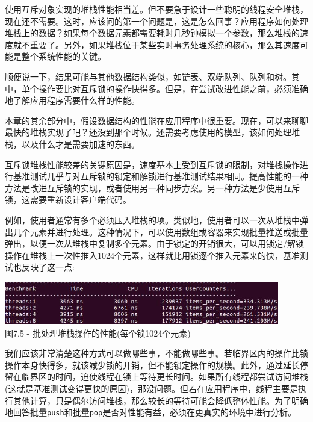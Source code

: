 使用互斥对象实现的堆栈性能相当差。但不要急于设计一些聪明的线程安全堆栈，现在还不需要。这时，应该问的第一个问题是，这是怎么回事？应用程序如何处理堆栈上的数据？如果每个数据元素都需要耗时几秒钟模拟一个参数，那么堆栈的速度就不重要了。另外，如果堆栈位于某些实时事务处理系统的核心，那么其速度可能是整个系统性能的关键。

顺便说一下，结果可能与其他数据结构类似，如链表、双端队列、队列和树。其中，单个操作要比对互斥锁的操作快得多。但是，在尝试改进性能之前，必须准确地了解应用程序需要什么样的性能。


本章的其余部分中，假设数据结构的性能在应用程序中很重要。现在，可以来聊聊最快的堆栈实现了吧？还没到那个时候。还需要考虑使用的模型，该如何处理堆栈，以及什么才是需要加速的东西。

互斥锁堆栈性能较差的关键原因是，速度基本上受到互斥锁的限制，对堆栈操作进行基准测试几乎与对互斥锁的锁定和解锁进行基准测试结果相同。提高性能的一种方法是改进互斥锁的实现，或者使用另一种同步方案。另一种方法是少使用互斥锁，这需要重新设计客户端代码。

例如，使用者通常有多个必须压入堆栈的项。类似地，使用者可以一次从堆栈中弹出几个元素并进行处理。这种情况下，可以使用数组或容器来实现批量推送或批量弹出，以便一次从堆栈中复制多个元素。由于锁定的开销很大，可以用锁定/解锁操作在堆栈上一次性推入1024个元素，这样就比用锁逐个推入元素来的快，基准测试也反映了这一点:

\begin{center}
\includegraphics[width=0.9\textwidth]{content/2/chapter7/images/5.jpg}\\
图7.5 - 批处理堆栈操作的性能(每个锁1024个元素)
\end{center}

我们应该非常清楚这种方式可以做哪些事，不能做哪些事。若临界区内的操作比锁操作本身快得多，就该减少锁的开销，但不能锁定操作的规模。此外，通过延长停留在临界区的时间，迫使线程在锁上等待更长时间。如果所有线程都尝试访问堆栈(这就是基准测试变得更快的原因)，那没问题。但若在应用程序中，线程主要是执行其他计算，只是偶尔访问堆栈，那么较长的等待可能会降低整体性能。为了明确地回答批量\texttt{push}和批量\texttt{pop}是否对性能有益，必须在更真实的环境中进行分析。


